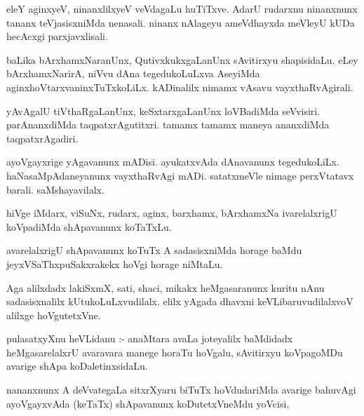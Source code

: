 \documentclass{article}
\begin{document}
\begin{mn}
eleY aginxyeV, ninanxlilxyeV  veVdagaLu  huTiTxve.   AdarU rudarxnu  ninanxnunx  tananx 
teVjasisxniMda nenasali.  ninanx  nAlageyu  ameVdhayxda meVleyU  kUDa  hecAcxgi parxjavxlisali.
\end{mn}

\begin{mn}
baLika  bArxhamxNaranUnx,  QutivxkukxgaLanUnx  sAvitirxyu  shapisidaLu.  eLey bArxhamxNarirA,  niVvu  
dAna  tegedukoLuLxva AseyiMda  aginxhoVtarxvaninxTuTxkoLiLx.  kADinalilx  nimamx vAsavu  vayxthaRvAgirali.
\end{mn}

\begin{mn}
yAvAgalU  tiVthaRgaLanUnx,  keSxtarxgaLanUnx  loVBadiMda seVvisiri.  parAnanxdiMda 
taqpatxrAgutitxri.  tamamx tamamx  maneya ananxdiMda taqpatxrAgadiri.
\end{mn}

\begin{mn}
ayoVgayxrige  yAgavanunx mADisi.  ayukatxvAda dAnavanunx tegedukoLiLx.  haNasaMpAdaneyanunx  
vayxthaRvAgi mADi.  satatxmeVle  nimage perxVtatavx barali.  saMshayavilalx.
\end{mn}

\begin{mn}
hiVge  iMdarx, viSuNx, rudarx, aginx, barxhamx, bArxhamxNa ivarelalxrigU koVpadiMda  shApavanunx  koTaTxLu.
\end{mn}

\begin{mn}
avarelalxrigU  shApavanunx  koTuTx A sadasisxniMda horage baMdu jeyxVSaThxpuSakxrakekx  hoVgi horage niMtaLu.
\end{mn}

\begin{mn}
Aga alilxdadx lakiSxmX, sati, shaci, mikakx heMgasaranunx kuritu  nAnu  sadasisxnalilx  
kUtukoLuLxvudilalx.  elilx  yAgada  dhavxni  keVLibaruvudilalxvoV alilxge hoVgutetxVne.
\end{mn}

\begin{mn}
pulasatxyXnu heVLidanu :- anaMtara avaLa  joteyalilx baMdidadx  heMgasarelalxrU  avaravara  
manege  horaTu hoVgalu,  sAvitirxyu koVpagoMDu  avarige  shApa koDaletinxsidaLu.
\end{mn}

\begin{mn}
nananxnunx A deVvategaLa  sitxrXyaru  biTuTx hoVdudariMda avarige bahuvAgi ayoVgayxvAda 
(keTaTx) shApavanunx  koDutetxVneMdu  yoVcisi, 
\end{mn}
\end{document}
